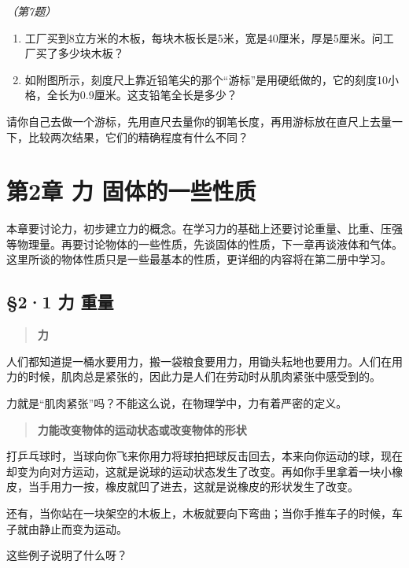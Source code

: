 \emph{（第7题）}

\begin{enumerate}
\def\labelenumi{\arabic{enumi}.}
\setcounter{enumi}{5}
\item
  工厂买到8立方米的木板，每块木板长是5米，宽是40厘米，厚是5厘米。问工厂买了多少块木板？
\item
  如附图所示，刻度尺上靠近铅笔尖的那个``游标''是用硬纸做的，它的刻度10小格，全长为0.9厘米。这支铅笔全长是多少？
\end{enumerate}

请你自己去做一个游标，先用直尺去量你的钢笔长度，再用游标放在直尺上去量一下，比较两次结果，它们的精确程度有什么不同？

\chapter{第2章 力
固体的一些性质}\label{ux7b2c2ux7ae0-ux529b-ux56faux4f53ux7684ux4e00ux4e9bux6027ux8d28}

本章要讨论力，初步建立力的概念。在学习力的基础上还要讨论重量、比重、压强等物理量。再要讨论物体的一些性质，先谈固体的性质，下一章再谈液体和气体。这里所谈的物体性质只是一些最基本的性质，更详细的内容将在第二册中学习。

\section{§2·1 力 重量}\label{ux529b-ux91cdux91cf}

\begin{quote}
\textbf{力}
\end{quote}

人们都知道提一桶水要用力，搬一袋粮食要用力，用锄头耘地也要用力。人们在用力的时候，肌肉总是紧张的，因此力是人们在劳动时从肌肉紧张中感受到的。

力就是``肌肉紧张''吗？不能这么说，在物理学中，力有着严密的定义。

\begin{quote}
\textbf{力能改变物体的运动状态或改变物体的形状}
\end{quote}

打乒乓球时，当球向你飞来你用力将球拍把球反击回去，本来向你运动的球，现在却变为向对方运动，这就是说球的运动状态发生了改变。再如你手里拿着一块小橡皮，当手用力一按，橡皮就凹了进去，这就是说橡皮的形状发生了改变。

还有，当你站在一块架空的木板上，木板就要向下弯曲；当你手推车子的时候，车子就由静止而变为运动。

这些例子说明了什么呀？

